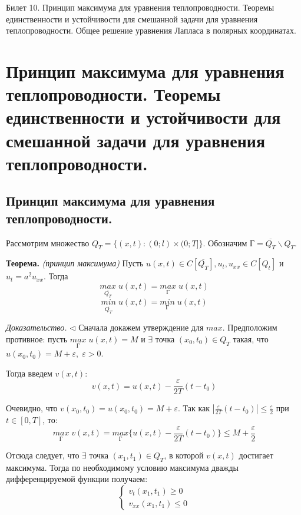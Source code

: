 \documentclass[11pt,a4paper]{article}
\begin{document}
    Билет 10. Принцип максимума для уравнения теплопроводности. Теоремы единственности и устойчивости для смешанной задачи для уравнения теплопроводности. Общее решение уравнения Лапласа в полярных координатах.
    \section{Принцип максимума для уравнения теплопроводности. Теоремы единственности и устойчивости для смешанной задачи для уравнения теплопроводности.}
    \subsection{Принцип максимума для уравнения теплопроводности.}
    
    Рассмотрим множество $Q_T = \{(x, t) : (0; l) × (0; T]\}$. Обозначим $Г = \overline{Q_T} \backslash Q_T$.
    \par
    \textbf{Теорема.} \textit{(принцип максимума)} Пусть $u(x,t) \in C[\overline{Q_T}], u_t, u_{xx} \in C[Q_t]$ и $u_t = a^2u_{xx}$. Тогда
    $$
    \underset{\overline{Q_T}}{max} \; u(x,t) = \underset{Г}{max} \; u(x,t)
    $$
    $$
    \underset{\overline{Q_T}}{min} \; u(x,t) = \underset{Г}{min} \; u(x,t)
    $$
    
    \textit{Доказательство.} $\triangleleft$ Сначала докажем утверждение для $max$. Предположим противное: пусть $\underset{Г}{max} \; u(x,t) = M$ и $\exists$ точка $(x_0,t_0) \in Q_T$ такая, что $u(x_0,t_0)= M + \varepsilon, \; \varepsilon > 0$.
    \par
    Тогда введем $v(x,t)$:
    \begin{equation}
        \label{eq1}
        v(x,t) = u(x,t) - \frac{\varepsilon}{2T}(t - t_0)
    \end{equation}
    
    Очевидно, что $v(x_0,t_0) = u(x_0,t_0) = M + \varepsilon$. Так как $|\frac{\varepsilon}{2T}(t - t_0)| \leq \frac{\varepsilon}{2}$ при $t \in [0,T]$, то:
    $$
    \underset{Г}{max} \; v(x,t) = \underset{Г}{max} \{u(x,t) - \frac{\varepsilon}{2T}(t - t_0)\} \leqslant M + \frac{\varepsilon}{2}
    $$
    
    Отсюда следует, что $\exists$ точка $(x_1,t_1) \in Q_T$, в которой $v(x,t)$ достигает максимума. Тогда по необходимому условию максимума дважды дифференцируемой функции получаем:
    \begin{equation}
        \label{eq2}
        \begin{cases}
        v_t(x_1,t_1) \geqslant 0 \\
        v_{xx}(x_1,t_1) \leqslant 0
        \end{cases}
    \end{equation}
    
\end{document}
